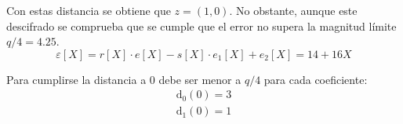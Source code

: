 Con estas distancia se obtiene que \(z=(1,0)\). No obstante, aunque este descifrado se comprueba que se cumple que el error no supera la magnitud límite $q/4=4.25$.
\begin{equation}
	\varepsilon [X]=r[X]\cdot e[X]- s[X]\cdot e_1[X] +e_2[X]=14+16X
\end{equation}

Para cumplirse la distancia a \(0\) debe ser menor a $q/4$ para cada coeficiente:
\begin{equation}
	\begin{array}{l}
		\text{d}_0(0) = 3 \\
		\text{d}_1(0) = 1
	\end{array} 
\end{equation}